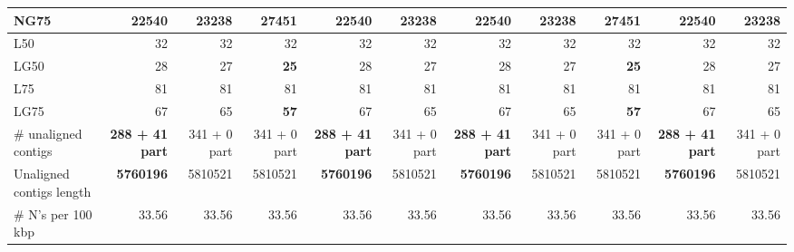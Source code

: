 \documentclass[12pt,a4paper]{article}
\begin{document}
\begin{table}[ht]
\begin{center}
\begin{tabular}{|l*{10}{|r}|}
NG75 & 22540 & 23238 & {\bf 27451} & 22540 & 23238 & 22540 & 23238 & {\bf 27451} & 22540 & 23238 \\ \hline
L50 & 32 & 32 & 32 & 32 & 32 & 32 & 32 & 32 & 32 & 32 \\ \hline
LG50 & 28 & 27 & {\bf 25} & 28 & 27 & 28 & 27 & {\bf 25} & 28 & 27 \\ \hline
L75 & 81 & 81 & 81 & 81 & 81 & 81 & 81 & 81 & 81 & 81 \\ \hline
LG75 & 67 & 65 & {\bf 57} & 67 & 65 & 67 & 65 & {\bf 57} & 67 & 65 \\ \hline
\# unaligned contigs & {\bf 288 + 41 part} & 341 + 0 part & 341 + 0 part & {\bf 288 + 41 part} & 341 + 0 part & {\bf 288 + 41 part} & 341 + 0 part & 341 + 0 part & {\bf 288 + 41 part} & 341 + 0 part \\ \hline
Unaligned contigs length & {\bf 5760196} & 5810521 & 5810521 & {\bf 5760196} & 5810521 & {\bf 5760196} & 5810521 & 5810521 & {\bf 5760196} & 5810521 \\ \hline
\# N's per 100 kbp & 33.56 & 33.56 & 33.56 & 33.56 & 33.56 & 33.56 & 33.56 & 33.56 & 33.56 & 33.56 \\ \hline
\end{tabular}
\end{center}
\end{table}
\end{document}
